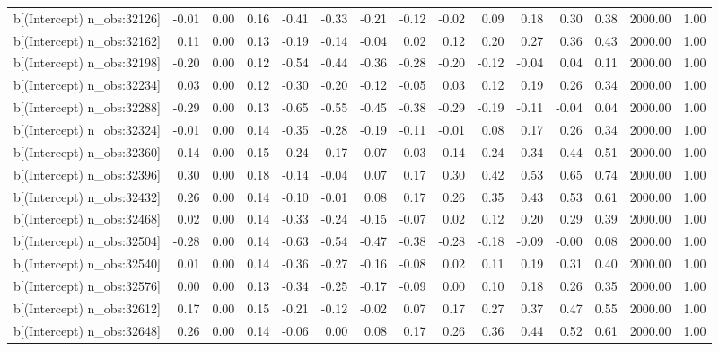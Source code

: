 \begin{table}[ht]
\begin{tabular}{rrrrrrrrrrrrrrr}
  b[(Intercept) n\_obs:32126] & -0.01 & 0.00 & 0.16 & -0.41 & -0.33 & -0.21 & -0.12 & -0.02 & 0.09 & 0.18 & 0.30 & 0.38 & 2000.00 & 1.00 \\ 
  b[(Intercept) n\_obs:32162] & 0.11 & 0.00 & 0.13 & -0.19 & -0.14 & -0.04 & 0.02 & 0.12 & 0.20 & 0.27 & 0.36 & 0.43 & 2000.00 & 1.00 \\ 
  b[(Intercept) n\_obs:32198] & -0.20 & 0.00 & 0.12 & -0.54 & -0.44 & -0.36 & -0.28 & -0.20 & -0.12 & -0.04 & 0.04 & 0.11 & 2000.00 & 1.00 \\ 
  b[(Intercept) n\_obs:32234] & 0.03 & 0.00 & 0.12 & -0.30 & -0.20 & -0.12 & -0.05 & 0.03 & 0.12 & 0.19 & 0.26 & 0.34 & 2000.00 & 1.00 \\ 
  b[(Intercept) n\_obs:32288] & -0.29 & 0.00 & 0.13 & -0.65 & -0.55 & -0.45 & -0.38 & -0.29 & -0.19 & -0.11 & -0.04 & 0.04 & 2000.00 & 1.00 \\ 
  b[(Intercept) n\_obs:32324] & -0.01 & 0.00 & 0.14 & -0.35 & -0.28 & -0.19 & -0.11 & -0.01 & 0.08 & 0.17 & 0.26 & 0.34 & 2000.00 & 1.00 \\ 
  b[(Intercept) n\_obs:32360] & 0.14 & 0.00 & 0.15 & -0.24 & -0.17 & -0.07 & 0.03 & 0.14 & 0.24 & 0.34 & 0.44 & 0.51 & 2000.00 & 1.00 \\ 
  b[(Intercept) n\_obs:32396] & 0.30 & 0.00 & 0.18 & -0.14 & -0.04 & 0.07 & 0.17 & 0.30 & 0.42 & 0.53 & 0.65 & 0.74 & 2000.00 & 1.00 \\ 
  b[(Intercept) n\_obs:32432] & 0.26 & 0.00 & 0.14 & -0.10 & -0.01 & 0.08 & 0.17 & 0.26 & 0.35 & 0.43 & 0.53 & 0.61 & 2000.00 & 1.00 \\ 
  b[(Intercept) n\_obs:32468] & 0.02 & 0.00 & 0.14 & -0.33 & -0.24 & -0.15 & -0.07 & 0.02 & 0.12 & 0.20 & 0.29 & 0.39 & 2000.00 & 1.00 \\ 
  b[(Intercept) n\_obs:32504] & -0.28 & 0.00 & 0.14 & -0.63 & -0.54 & -0.47 & -0.38 & -0.28 & -0.18 & -0.09 & -0.00 & 0.08 & 2000.00 & 1.00 \\ 
  b[(Intercept) n\_obs:32540] & 0.01 & 0.00 & 0.14 & -0.36 & -0.27 & -0.16 & -0.08 & 0.02 & 0.11 & 0.19 & 0.31 & 0.40 & 2000.00 & 1.00 \\ 
  b[(Intercept) n\_obs:32576] & 0.00 & 0.00 & 0.13 & -0.34 & -0.25 & -0.17 & -0.09 & 0.00 & 0.10 & 0.18 & 0.26 & 0.35 & 2000.00 & 1.00 \\ 
  b[(Intercept) n\_obs:32612] & 0.17 & 0.00 & 0.15 & -0.21 & -0.12 & -0.02 & 0.07 & 0.17 & 0.27 & 0.37 & 0.47 & 0.55 & 2000.00 & 1.00 \\ 
  b[(Intercept) n\_obs:32648] & 0.26 & 0.00 & 0.14 & -0.06 & 0.00 & 0.08 & 0.17 & 0.26 & 0.36 & 0.44 & 0.52 & 0.61 & 2000.00 & 1.00 \\ 

\end{tabular}
\end{table}
